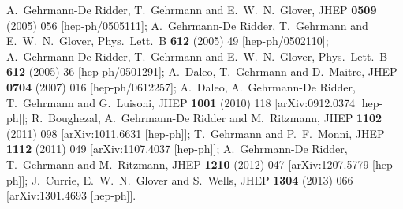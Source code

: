 \documentclass[12pt]{article}
\begin{document}
\begin{thebibliography}{99}
  A.~Gehrmann-De Ridder, T.~Gehrmann and E.~W.~N.~Glover,
  JHEP {\bf 0509} (2005) 056
  [hep-ph/0505111];
  A.~Gehrmann-De Ridder, T.~Gehrmann and E.~W.~N.~Glover,
  Phys.\ Lett.\ B {\bf 612} (2005) 49
  [hep-ph/0502110];
  A.~Gehrmann-De Ridder, T.~Gehrmann and E.~W.~N.~Glover,
  Phys.\ Lett.\ B {\bf 612} (2005) 36
  [hep-ph/0501291];
  A.~Daleo, T.~Gehrmann and D.~Maitre,
  JHEP {\bf 0704} (2007) 016
  [hep-ph/0612257];
  A.~Daleo, A.~Gehrmann-De Ridder, T.~Gehrmann and G.~Luisoni,
  JHEP {\bf 1001} (2010) 118
  [arXiv:0912.0374 [hep-ph]];
  R.~Boughezal, A.~Gehrmann-De Ridder and M.~Ritzmann,
  JHEP {\bf 1102} (2011) 098
  [arXiv:1011.6631 [hep-ph]];
  T.~Gehrmann and P.~F.~Monni,
  JHEP {\bf 1112} (2011) 049
  [arXiv:1107.4037 [hep-ph]];
  A.~Gehrmann-De Ridder, T.~Gehrmann and M.~Ritzmann,
  JHEP {\bf 1210} (2012) 047
  [arXiv:1207.5779 [hep-ph]];
  J.~Currie, E.~W.~N.~Glover and S.~Wells,
  JHEP {\bf 1304} (2013) 066
  [arXiv:1301.4693 [hep-ph]].
  

\end{thebibliography}
\end{document}
